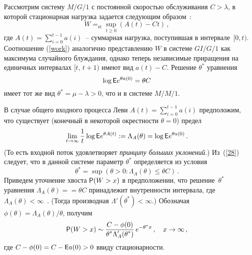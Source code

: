 \begin{multicols}{2}
Рассмотрим систему $M/G/1$ с постоянной скоростью обслуживания
$C>\lambda$, в которой стационарная нагрузка задается следующим образом~\cite {BQ}:
\begin{equation}
W=_{\mathrm{st}}\sup_{t\ge 0}(A(t)-Ct)\,,
\label{work}
\end{equation}
где $A(t)=\sum\limits_{i=0}^{t-1}a(i)$~-- суммарная нагрузка, поступившая в
интервале~$[0,t)$. Соотношение (\ref{work}) аналогично представлению
$W$ в сис\-те\-ме $GI/G/1$ как максимума случайного блуждания, однако
теперь независимые приращения на единичных интервалах $[t,\,t+1)$
имеют вид $a(t)-C.$ Решение $\theta^*$ уравнения
\begin{equation}
\log {\sf E} e ^{\theta a(0)}=\theta C
\label{28}
\end{equation}
имеет тот же вид $\theta^*=\mu-\lambda>0$, что и в сис\-те\-ме $M/M/1$.

В случае общего входного процесса Леви $A(t)$\linebreak $=\sum\limits_{i=0}^{t-1} a(i)$
предположим, что существует (конечный в некоторой окрестности
$\theta=0$) предел
\begin{equation*}
\lim_{t\to \infty}\frac{1}{t}\log {\sf E} e^{\theta
A(t)}:=\Lambda_A(\theta)=\log {\sf E} e^{\theta a(0)}\,.
\end{equation*}
(То есть входной поток удовлетворяет {\it принципу больших
уклонений}.) Из~(\ref{28}) следует, что в данной системе параметр
$\theta^*$ определяется из условия
\begin{equation}
\theta^*=\sup (\theta>0: \Lambda_A(\theta)\le \theta C)\,.
\label{30}
\end{equation}
Приведем уточнение хвоста ${\sf P}(W>x)$ в предположении, что решение~$\theta^*$
уравнения $\Lambda_A(\theta)=$\linebreak $= \theta C$ принадлежит внутренности интервала,
где\linebreak $\Lambda_A(\theta)<\infty$~\cite{Kelly}.
(Тогда производная $\Lambda'(\theta^*)<\infty$.) Обозначая $\phi(\theta)=\Lambda_A(\theta)/\theta$, получим
\begin{equation*}
{\sf P} (W> x)\sim \displaystyle\frac{\displaystyle C-\phi(0)\mathstrut}{\displaystyle \theta^*\Lambda_A^\prime (\theta^*)\mathstrut}\,e^{-\theta^*x}\,,\quad
x\to \infty\,,
\end{equation*}
где $C-\phi(0)=C-{\sf E} a(0)>0$ ввиду стационарности.


\end{multicols}
